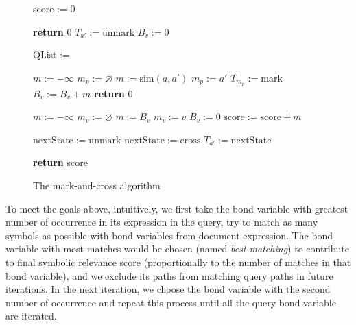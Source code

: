 \documentclass{acm_proc_article-sp}
\begin{document}
\begin{figure}
\begin{algorithmic}[1]

\State score := 0

\State \textbf{return} 0 
\EndIf
{}
\State $T_{a'} := \mathrm{unmark}$ 
\EndFor
{}
\State $B_v := 0$ 
\EndFor

\State QList := 


\State $m := -\infty$
\State $m_p := \varnothing$
\State $m := \mathrm{sim}(a, a')$ 
\State $m_p := a'$ 
\EndIf
\EndFor
{}
\State $T_{m_p} := \mathrm{mark}$ 
\State $B_v := B_v + m$
\Else
{}
\State \textbf{return} 0 
\EndIf
\EndFor

\label{line_bond_finish}

\State $m := -\infty$
\State $m_v := \varnothing $
\State $m := B_v$ 
\State $m_v := v$ 
\EndIf
\State $B_v := 0$ 
\EndFor
\State $\mathrm{score} := \mathrm{score} + m$ 

\State $\mathrm{nextState} := \mathrm{unmark}$ 
\Else
\State $\mathrm{nextState} := \mathrm{cross}$ 
\EndIf
{}
\State $T_{a'} := \mathrm{nextState}$ 
\EndIf
\EndFor
\EndFor

\EndIf

\EndFor

\State \textbf{return} score
\EndProcedure

\end{algorithmic}
\caption{The mark-and-cross algorithm}\label{markcrossalgo}
\end{figure}

To meet the goals above, intuitively, we first take the bond variable with greatest number of occurrence in its expression in the query, try to match as many symbols as possible with bond variables from document expression. 
The bond variable with most matches would be chosen (named \textit{best-matching}) to contribute to final symbolic relevance score (proportionally to the number of matches in that bond variable), 
and we exclude its paths from matching query paths in future iterations.
In the next iteration, we choose the bond variable with the second number of occurrence and repeat this process until all the query bond variable are iterated.
\end{document}

